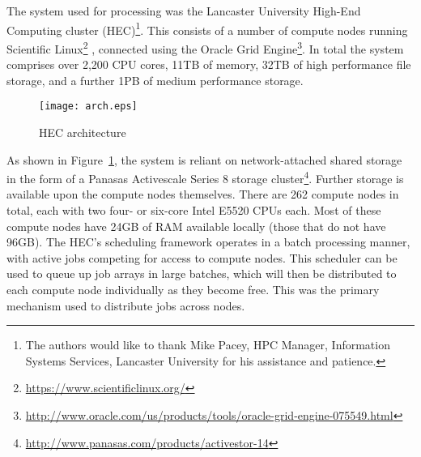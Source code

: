 The system used for processing was the Lancaster University High-End Computing cluster (HEC)\footnote{The authors would like to thank Mike Pacey, HPC Manager, Information Systems Services, Lancaster University for his assistance and patience.}.  This consists of a number of compute nodes running Scientific Linux\footnote{\url{https://www.scientificlinux.org/}}%
, connected using the Oracle Grid Engine\footnote{\url{http://www.oracle.com/us/products/tools/oracle-grid-engine-075549.html}}.  
In total the system comprises over 2,200 CPU cores, 11TB of memory, 32TB of high performance file storage, and a further 1PB of medium performance storage.


\begin{figure}[h]
   \centering
   \texttt{[image: arch.eps]}
   \caption{HEC architecture}
\label{fig:arch}
\end{figure}

As shown in Figure~\ref{fig:arch}, the system is reliant on network-attached shared storage in the form of a Panasas Activescale Series 8 storage cluster\footnote{\url{http://www.panasas.com/products/activestor-14}}\cite{Nagle2004PAS1048933.1049998}.  Further storage is available upon the compute nodes themselves.
There are 262 compute nodes in total, each with two four- or six-core Intel E5520 CPUs each.  Most of these compute nodes have 24GB of RAM available locally (those that do not have 96GB).
The HEC's scheduling framework operates in a batch processing manner, with active jobs competing for access to compute nodes.  This scheduler can be used to queue up job arrays in large batches, which will then be distributed to each compute node individually as they become free.  This was the primary mechanism used to distribute jobs across nodes.

